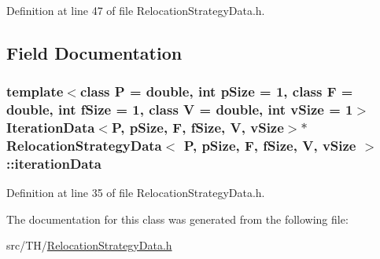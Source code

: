 Definition at line 47 of file Relocation\+Strategy\+Data.\+h.



\subsection{Field Documentation}
\subsubsection[{\texorpdfstring{iteration\+Data}{iterationData}}]{\setlength{\rightskip}{0pt plus 5cm}template$<$class P = double, int p\+Size = 1, class F = double, int f\+Size = 1, class V = double, int v\+Size = 1$>$ {\bf Iteration\+Data}$<$P, p\+Size, F, f\+Size, V, v\+Size$>$$\ast$ {\bf Relocation\+Strategy\+Data}$<$ P, p\+Size, F, f\+Size, V, v\+Size $>$\+::iteration\+Data}\hypertarget{structRelocationStrategyData_adacdd9bfa31c367ca0c5ac82b8d1d2e5}{}\label{structRelocationStrategyData_adacdd9bfa31c367ca0c5ac82b8d1d2e5}


Definition at line 35 of file Relocation\+Strategy\+Data.\+h.



The documentation for this class was generated from the following file\+:\begin{DoxyCompactItemize}
\item 
src/\+T\+H/\hyperlink{RelocationStrategyData_8h}{Relocation\+Strategy\+Data.\+h}\end{DoxyCompactItemize}

